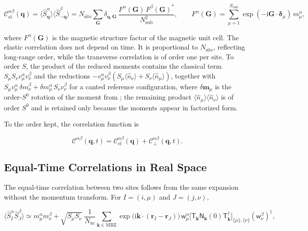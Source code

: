 \begin{equation}\label{eq-lswt-elastic-correlation}
\mathcal C_{\mathrm{el}}^{\alpha\beta}(\mathbf q)
=\big\langle\hat S_{\mathbf q}^\alpha\big\rangle\big\langle\hat S_{-\mathbf q}^\beta\big\rangle
=N_{\mathrm{site}}\sum_{\mathbf G}\delta_{\mathbf q,\mathbf G}\,
\frac{F^\alpha(\mathbf G)\,F^\beta(\mathbf G)^*}{N_{\mathrm{sub}}^2},
\qquad
F^\alpha(\mathbf G)=\sum_{\mu=1}^{N_{\mathrm{sub}}}\exp(-\mathrm i\mathbf G\cdot\boldsymbol\delta_\mu)\,m_\mu^\alpha,
\end{equation}

where \(F^\alpha(\mathbf G)\) is the magnetic structure factor of the magnetic unit cell. The elastic correlation does not depend on time. It is proportional to \(N_{\mathrm{site}}\), reflecting long-range order, while the transverse correlation is of order one per site. To order \(S\), the product of the reduced moments contains the classical term \(S_\mu S_\nu v_\mu^\alpha v_\nu^\beta\) and the reductions \(-v_\mu^\alpha v_\nu^\beta(S_\mu\langle\hat n_\nu\rangle+S_\nu\langle\hat n_\mu\rangle)\), together with \(S_\mu v_\mu^\alpha\,\delta m_\nu^\beta+\delta m_\mu^\alpha\,S_\nu v_\nu^\beta\) for a canted reference configuration, where \(\delta\mathbf m_\mu\) is the order-\(S^0\) rotation of the moment from ; the remaining product \(\langle\hat n_\mu\rangle\langle\hat n_\nu\rangle\) is of order \(S^0\) and is retained only because the moments appear in factorized form.

To the order kept, the correlation function is

\begin{equation}\label{eq-lswt-correlation-lswt-form}
\mathcal C^{\alpha\beta}(\mathbf q,t)=\mathcal C_{\mathrm{el}}^{\alpha\beta}(\mathbf q)+\mathcal C_\perp^{\alpha\beta}(\mathbf q,t).
\end{equation}

\subsection{Equal-Time Correlations in Real Space}

The equal-time correlation between two sites follows from the same expansion without the momentum transform. For \(I=(i,\mu)\) and \(J=(j,\nu)\),

\[
\big\langle\hat S_I^\alpha\hat S_J^\beta\big\rangle
\simeq m_\mu^\alpha m_\nu^\beta
+\sqrt{S_\mu S_\nu}\;\frac{1}{N_{\mathrm{uc}}}\sum_{\mathbf k\in\mathrm{MBZ}}\exp\!\big(\mathrm i\mathbf k\cdot(\mathbf r_I-\mathbf r_J)\big)
\,\mathsf w_\mu^\alpha\big[\mathsf T_{\mathbf k}\mathsf N_{\mathbf k}(0)\mathsf T_{\mathbf k}^\dagger\big]_{\{\mu\},\{\nu\}}(\mathsf w_\nu^\beta)^\dagger,
\]

